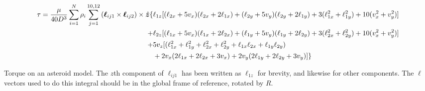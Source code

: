 \documentclass[aps,twocolumn,secnumarabic,balancelastpage,amsmath,amssymb,nofootinbib,floatfix]{revtex4-1}
\begin{document}
\begin{table*} 
    \begin{equation}
        \begin{aligned}
        \tau = \frac{\mu}{40D^3}\sum_{i=1}^N\rho_i \sum_{j=1}^{10, 12} \left( \bm\ell_{ij1} \times \bm\ell_{ij2} \right) \times \hat {\bm z} \{
        &\ell_{1z} [(\ell_{2x} + 5v_x)(\ell_{2x} + 2\ell_{1x}) + (\ell_{2y} + 5 v_y)(\ell_{2y}+2\ell_{1y}) + 3 (\ell_{1x}^2 + \ell_{1y}^2) + 10(v_x^2 + v_y^2)]\\
        + &\ell_{2z} [ (\ell_{1x}+5v_x)(\ell_{1x}+2\ell_{2x}) + (\ell_{1y}+5v_y)(\ell_{1y}+2\ell_{2y}) + 3 (\ell_{2x}^2 + \ell_{2y}^2) + 10(v_x^2 + v_y^2)]\\
        + &5v_z [(\ell_{1x}^2 + \ell_{1y}^2 + \ell_{2x}^2 + \ell_{2y}^2 + \ell_{1x} \ell_{2x} + \ell_{1y} \ell_{2y}) \\
        & + 2v_x(2\ell_{1x} + 2\ell_{2x} + 3 v_x) + 2v_y(2\ell_{1y} + 2\ell_{2y} + 3 v_y)]\}
        \end{aligned}
    \label{eqn:analytical-torque}
    \end{equation}
    \caption*{Torque on an asteroid model. The $z$th component of $\bm \ell_{ij1}$ has been written as $\ell_{1z}$ for brevity, and likewise for other components. The $\bm \ell$ vectors used to do this integral should be in the global frame of reference, rotated by $R$.}
\end{table*}




\end{document}
